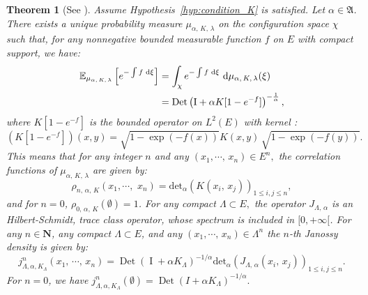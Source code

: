 \documentclass[11pt,a4paper]{amsart}
\newtheorem{Theorem}{Theorem}
\begin{document}
\begin{Theorem}[See ]\label{thm:existence}
  Assume Hypothesis~\ref{hyp:condition_K} is satisfied.  Let $\alpha
  \in {{\mathfrak A}}$. There exists a unique probability measure
  $\mu_{\alpha,\,K,\,\lambda}$ on the configuration space $\chi$ such
  that, for any nonnegative bounded measurable function $f$ on $E$
  with compact support, we have:
  \begin{align}
    {{\mathbb E}}_{\mu_{\alpha,\,K,\,\lambda}}\left[ e^{-\int f {\text{ d}}\xi }\right]&=
    \int_{\chi} e^{-\int f {\text{ d}}\xi }
    {\text{ d}}\mu_{\alpha,\,K,\,\lambda}(\xi)\notag\\
    & ={\operatorname{Det}} \left( {\operatorname{I}}+\alpha K
      [1-e^{-f}]\right)^{-\frac{1}{\alpha}},\label{eq:3}
  \end{align}
  where $K[1-e^{-f}]$ is the bounded operator on $L^2(E)$ with kernel
  :
  \begin{equation*}
    (K[1-e^{-f}])(x,y)=  \sqrt{1-\exp(-f(x))} K(x,y)\, \sqrt{1-\exp(-f(y))}.
  \end{equation*}
  This means that for any integer $n$ and any $(x_1,\cdots,\, x_n) \in
  E^n,$ the correlation functions of $\mu_{\alpha,\, K,\, \lambda}$
  are given by:
  \begin{equation*}
    \rho_{n,\,\alpha,\, K}(x_1,\cdots,\,\, x_n)={{\text{det}}}_{\alpha}\left( K\left( x_i,\, x_j\right)
    \right)_{1\le i,j\le n},
  \end{equation*}
  and for $n=0$, $\rho_{0,\,\alpha,\,K}(\emptyset)=1$.  For any
  compact $\Lambda\subset E,$ the operator $J_{\Lambda,\, \alpha}$ is
  an Hilbert-Schmidt, trace class operator, whose spectrum is included
  in $[0, +\infty[$.  For any $n \in {{\mathbf N}}$, any compact $\Lambda\subset
  E$, and any $(x_1,\cdots,\, x_n) \in \Lambda^n$ the $n$-th Janossy
  density is given by:
  \begin{equation}\label{eq:4}
    j_{\Lambda,\alpha,K_{\Lambda}}^{n}\left( x_1,\, \cdots,\, x_n\right)
    ={\operatorname{Det}}\left( {\operatorname{I}}+\alpha
      K_{\Lambda}\right)^{-1/\alpha}{{\text{det}}}_{\alpha}\left(J_{\Lambda,\,\alpha} (x_i,\, x_j)\right) _{1\le i,j \le n}.
  \end{equation}
  For $n=0$, we have
  \begin{math}
    j_{\Lambda,\alpha,K_{\Lambda}}^{n}\left( \emptyset\right)
    ={\operatorname{Det}}\left( I+\alpha K_{\Lambda}\right)^{-1/\alpha}.
  \end{math}
\end{Theorem}
\end{document}
